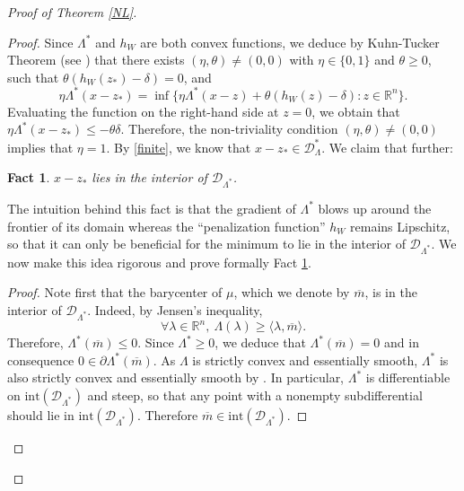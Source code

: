 \documentclass[aop,preprint]{imsart}
\newcommand\RR{\mathbb{R}}
\numberwithin{equation}{section}
\theoremstyle{definition}
\theoremstyle{plain}
\newtheorem{fact}[Def]{Fact}
\theoremstyle{remark}
\begin{document}
\begin{proof}[Proof of Theorem \ref{NL}]
\begin{proof}
Since $\Lambda^*$ and $h_W$ are both convex functions, we deduce by Kuhn-Tucker Theorem (see \cite[Theorem 9.4]{Clarke}) that there exists $(\eta, \theta)\neq (0,0)$ with $\eta \in\{0,1\}$ and $\theta \geq 0$, such that $\theta(h_W(z_*) -\delta) = 0$, and
\begin{equation} \label{optimpb} \eta \Lambda^*(x-z_*) = \inf \big\{ \eta \Lambda^*(x-z) + \theta (h_W(z)-\delta) : z \in \RR^n \big\}.\end{equation}
 Evaluating the function on the right-hand side at $z=0$, we obtain that $\eta \Lambda^*(x-z_*) \leq -\theta \delta$. Therefore, the non-triviality condition $(\eta,\theta) \neq (0,0)$ implies that $\eta = 1$.
 By \eqref{finite}, we know that $x-z_* \in \mathcal{D}_\Lambda^*$. We claim that further:
\begin{fact}\label{interiorpoint}
 $x-z_*$ lies in the interior of $\mathcal{D}_{\Lambda^*}$. 
\end{fact}
 The intuition behind this fact is that the gradient of $\Lambda^*$ blows up around the frontier of its domain whereas the ``penalization function'' $h_W$ remains Lipschitz, so that it can only be beneficial for the minimum to lie in the interior of $\mathcal{D}_{\Lambda^*}$. We now make this idea rigorous and prove formally Fact \ref{interiorpoint}.
\begin{proof}
Note first that the barycenter of $\mu$, which we denote by $\overline{m}$, is in the interior of $\mathcal{D}_{\Lambda^*}$. Indeed, by Jensen's inequality, 
\begin{equation} \label{subdiff0} \forall \lambda \in \RR^n, \ \Lambda(\lambda) \geq \langle \lambda,\overline{m}\rangle.\end{equation}
Therefore, $\Lambda^*(\overline{m}) \leq 0$. Since $\Lambda^*\geq 0$, we deduce that $\Lambda^*(\overline{m})=0$ and in consequence $ 0 \in \partial \Lambda^*(\overline{m})$. As $\Lambda$ is strictly convex and essentially smooth, $\Lambda^*$ is also strictly convex and essentially smooth by \cite[Theorem 26.5]{Rockafeller}. In particular, $\Lambda^*$ is differentiable on $\mathrm{int}(\mathcal{D}_{\Lambda^*})$ and steep, so that any point with a nonempty subdifferential should lie in $\mathrm{int}(\mathcal{D}_{\Lambda^*})$. Therefore $\overline{m} \in \mathrm{int}(\mathcal{D}_{\Lambda^*})$.



\end{proof}
\end{proof}
\end{proof}
\end{document}
